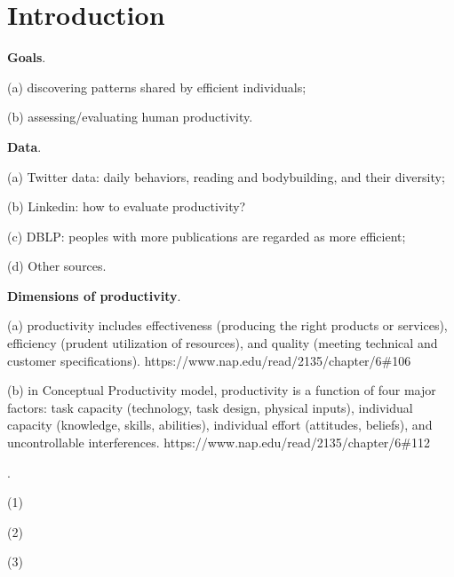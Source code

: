 \section{Introduction}
\label{sec-intro}

{\bf Goals}.

(a) discovering patterns shared by efficient individuals;

(b) assessing/evaluating human productivity.

{\bf Data}.

(a) Twitter data: daily behaviors, \eg reading and bodybuilding, and their diversity;

(b) Linkedin: how to evaluate productivity?

(c) DBLP: peoples with more publications are regarded as more efficient;

(d) Other sources.


{\bf Dimensions of productivity}.

(a) productivity includes effectiveness (producing the right products or services), efficiency (prudent utilization of resources), and quality (meeting technical and customer specifications).
https://www.nap.edu/read/2135/chapter/6\#106

(b) in Conceptual Productivity model, productivity is a function of four major factors: task capacity (technology, task design, physical inputs), individual capacity (knowledge, skills, abilities), individual effort (attitudes, beliefs), and uncontrollable interferences.
https://www.nap.edu/read/2135/chapter/6\#112


.

\ni (1)

\ni (2)

\ni (3) 
